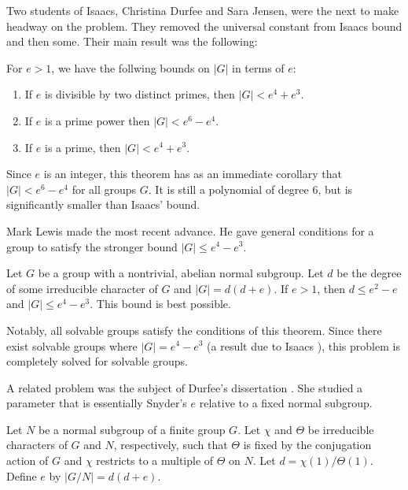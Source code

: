 \documentclass[main.tex]{subfiles}
\begin{document}
Two students of Isaacs, Christina Durfee and Sara Jensen, were the next to make headway on the problem. They removed the universal constant from Isaacs bound and then some. Their main result was the following:

\hss

\begin{theorem}
For $e > 1$, we have the follwing bounds on $|G|$ in terms of $e$:
\begin{enumerate}
	\item If $e$ is divisible by two distinct primes, then $|G| < e^4 + e^3$.
	\item If $e$ is a prime power then $|G| < e^6 - e^4$.
	\item If $e$ is a prime, then $|G| < e^4 + e^3$.
\end{enumerate}
\end{theorem}

\hss

\noindent Since $e$ is an integer, this theorem has as an immediate corollary that $|G| < e^6 - e^4$ for all groups $G$. It is still a polynomial of degree 6, but is significantly smaller than Isaacs' bound.

Mark Lewis made the most recent advance. He gave general conditions \cite{lewisarticle} for a group to satisfy the stronger bound $|G| \le e^4 - e^3$.

\hss

\begin{theorem} Let $G$ be a group with a nontrivial, abelian normal subgroup. Let $d$ be the degree of some irreducible character of $G$ and $|G| = d(d+e)$. If $e > 1$, then $d \le e^2 - e$ and $|G| \le e^4 - e^3$. This bound is best possible.
\end{theorem}

\hss

\noindent Notably, all solvable groups satisfy the conditions of this theorem. Since there exist solvable groups where $|G| = e^4 - e^3$ (a result due to Isaacs \cite{isaacsarticle}), this problem is completely solved for solvable groups. 

\hss

A related problem was the subject of Durfee's dissertation \cite{durfeedissertation}. She studied a parameter that is essentially Snyder's $e$ relative to a fixed normal subgroup. 

\hss

\begin{definition}
Let $N$ be a normal subgroup of a finite group $G$. Let $\chi$ and $\Theta$ be irreducible characters of $G$ and $N$, respectively, such that $\Theta$ is fixed by the conjugation action of $G$ and $\chi$ restricts to a multiple of $\Theta$ on $N$. Let $d = \chi(1)/\Theta(1)$. Define $e$ by $|G/N| = d(d+e)$.
\end{definition}
\end{document}

